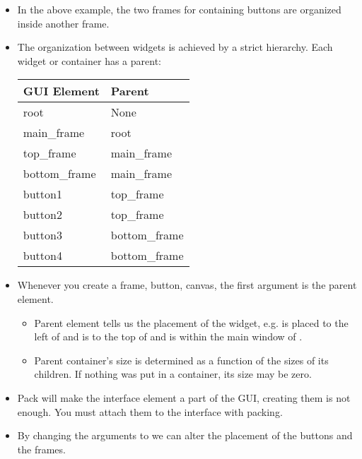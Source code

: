 \documentclass[letterpaper,10pt,english]{sphinxmanual}
\begin{document}
\begin{itemize}
\begin{sphinxVerbatim}[commandchars=\\\{\}]
\end{sphinxVerbatim}

\item {} 
In the above example, the two frames for containing buttons are
organized inside another frame.

\item {} 
The organization between widgets is achieved by a strict hierarchy.
Each widget or container has a parent:


\begin{savenotes}\sphinxattablestart
\centering
\begin{tabulary}{\linewidth}[t]{|T|T|}
\hline
\sphinxstyletheadfamily 
GUI Element
&\sphinxstyletheadfamily 
Parent
\\
\hline
root
&
None
\\
\hline
main\_frame
&
root
\\
\hline
top\_frame
&
main\_frame
\\
\hline
bottom\_frame
&
main\_frame
\\
\hline
button1
&
top\_frame
\\
\hline
button2
&
top\_frame
\\
\hline
button3
&
bottom\_frame
\\
\hline
button4
&
bottom\_frame
\\
\hline
\end{tabulary}
\par
\sphinxattableend\end{savenotes}

\item {} 
Whenever you create a frame, button, canvas, the first argument is the
parent element.
\begin{itemize}
\item {} 
Parent element tells us the placement of the widget, e.g.  is
placed to the left of  and  is to the top of
 and  is within the main window of .

\item {} 
Parent container’s size is determined as a function of the sizes of
its children. If nothing was put in a container, its size may be zero.

\end{itemize}

\item {} 
Pack will make the interface element a part of the GUI, creating them is not
enough. You must attach them to the interface with packing.

\item {} 
By changing the arguments to  we can alter the
placement of the buttons and the frames.

\end{itemize}
\end{document}
